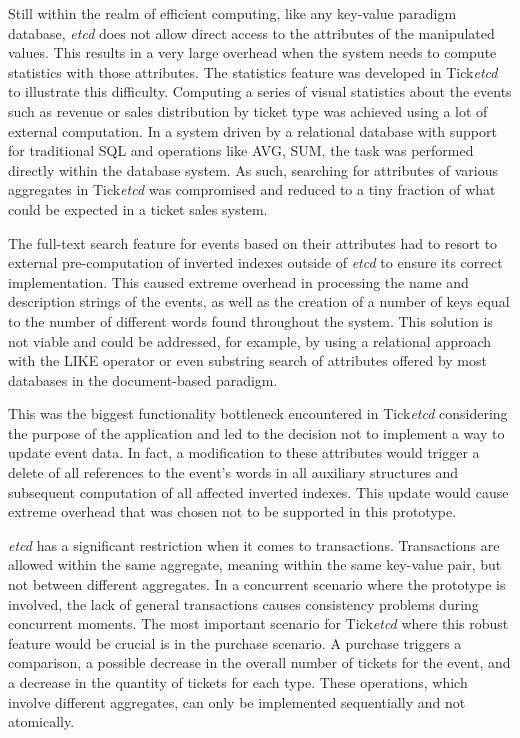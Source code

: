 \documentclass[screen,review]{acmart}
\begin{document}
Still within the realm of efficient computing, like any key-value paradigm database, \textit{etcd} does not allow direct access to the attributes of the manipulated values. This results in a very large overhead when the system needs to compute statistics with those attributes. The statistics feature was developed in Tick\textit{etcd} to illustrate this difficulty. Computing a series of visual statistics about the events such as revenue or sales distribution by ticket type was achieved using a lot of external computation. In a system driven by a relational database with support for traditional SQL and operations like AVG, SUM, the task was performed directly within the database system.
As such, searching for attributes of various aggregates in Tick\textit{etcd} was compromised and reduced to a tiny fraction of what could be expected in a ticket sales system.

The full-text search feature for events based on their attributes had to resort to external pre-computation of inverted indexes outside of \textit{etcd} to ensure its correct implementation. This caused extreme overhead in processing the name and description strings of the events, as well as the creation of a number of keys equal to the number of different words found throughout the system. This solution is not viable and could be addressed, for example, by using a relational approach with the LIKE operator or even substring search of attributes offered by most databases in the document-based paradigm.

This was the biggest functionality bottleneck encountered in Tick\textit{etcd} considering the purpose of the application and led to the decision not to implement a way to update event data. In fact, a modification to these attributes would trigger a delete of all references to the event's words in all auxiliary structures and subsequent computation of all affected inverted indexes. This update would cause extreme overhead that was chosen not to be supported in this prototype.

\textit{etcd} has a significant restriction when it comes to transactions. Transactions are allowed within the same aggregate, meaning within the same key-value pair, but not between different aggregates. In a concurrent scenario where the prototype is involved, the lack of general transactions causes consistency problems during concurrent moments. The most important scenario for Tick\textit{etcd} where this robust feature would be crucial is in the purchase scenario. A purchase triggers a comparison, a possible decrease in the overall number of tickets for the event, and a decrease in the quantity of tickets for each type. These operations, which involve different aggregates, can only be implemented sequentially and not atomically.
\end{document}
